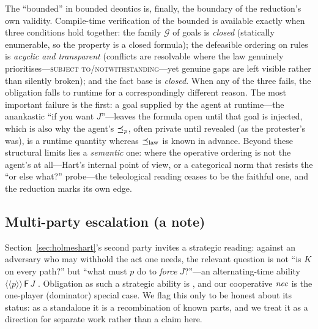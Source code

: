The ``bounded'' in bounded deontics is, finally, the boundary of the reduction's own
validity. Compile-time verification of the bounded \MUST{} is available exactly when
three conditions hold together: the family $\mathcal{G}$ of goals is \emph{closed}
(statically enumerable, so the property is a closed formula); the defeasible ordering on
rules is \emph{acyclic and transparent} (conflicts are resolvable where the law
genuinely prioritises---\textsc{subject to}/\textsc{notwithstanding}---yet genuine gaps
are left visible rather than silently broken); and the fact base is \emph{closed}. When
any of the three fails, the obligation falls to runtime for a correspondingly different
reason. The most important failure is the first: a goal supplied by the agent at
runtime---the anankastic ``if you want $J$''---leaves the formula open until that goal is
injected, which is also why the agent's $\preceq_{p}$, often private until revealed (as the
protester's was), is a runtime quantity whereas $\preceq_{\mathrm{law}}$ is known in advance. Beyond these
structural limits lies a \emph{semantic} one: where the operative ordering is not the
agent's at all---Hart's internal point of view, or a categorical norm that resists the
``or else what?'' probe---the teleological reading ceases to be the faithful one, and the
reduction marks its own edge.

\subsection{Multi-party escalation (a note)}
\label{sec:atl}

Section~\ref{sec:holmeshart}'s second party invites a strategic reading: against an
adversary who may withhold the act one needs, the relevant question is not ``is $K$ on
every path?'' but ``what must $p$ do to \emph{force} $J$?''---an alternating-time
ability $\langle\!\langle p\rangle\!\rangle\,\mathsf{F}\,J$ . Obligation as such a strategic ability is , and our cooperative $\mathit{nec}$ is the one-player (dominator) special case. We
flag this only to be honest about its status: as a standalone it is a recombination of
known parts, and we treat it as a direction for separate work rather than a claim here.
